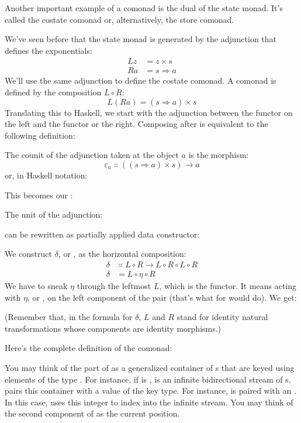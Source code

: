 Another important example of a comonad is the dual of the state monad.
It's called the costate comonad or, alternatively, the store comonad.

We've seen before that the state monad is generated by the adjunction
that defines the exponentials:
\begin{align*}
  L z & = z\times{}s      \\
  R a & = s \Rightarrow a
\end{align*}
We'll use the same adjunction to define the costate comonad. A comonad
is defined by the composition $L \circ R$:
\[L (R a) = (s \Rightarrow a)\times{}s\]
Translating this to Haskell, we start with the adjunction between the
 functor on the left and the  functor or the
right. Composing  after  is equivalent to
the following definition:

The counit of the adjunction taken at the object $a$ is the
morphism:
\[\varepsilon_a \Colon ((s \Rightarrow a)\times{}s) \to a\]
or, in Haskell notation:

This becomes our :

The unit of the adjunction:

can be rewritten as partially applied data constructor:

We construct $\delta$, or , as the horizontal composition:
\begin{align*}
  \delta & \Colon L \circ R \to L \circ R \circ L \circ R \\
  \delta & = L \circ \eta \circ R
\end{align*}
We have to sneak $\eta$ through the leftmost $L$, which is the
 functor. It means acting with $\eta$, or , on
the left component of the pair (that's what  for
 would do). We get:

(Remember that, in the formula for $\delta$, $L$ and $R$ stand
for identity natural transformations whose components are identity
morphisms.)

Here's the complete definition of the  comonad:

You may think of the  part of  as a
generalized container of s that are keyed using elements of
the type . For instance, if  is ,
 is an infinite bidirectional stream of
s.  pairs this container with a value of the key
type. For instance,  is paired with an
. In this case,  uses this integer to index
into the infinite stream. You may think of the second component of
 as the current position.

